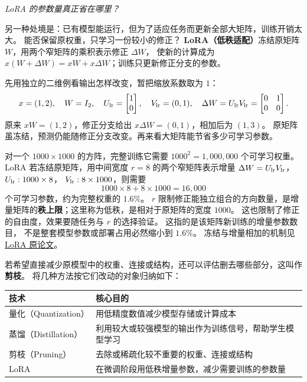 \begin{example}
\noindent\emph{LoRA 的参数量真正省在哪里？}\par

另一种处境是：已有模型能运行，但为了适应任务而更新全部大矩阵，训练开销太大。
能否保留原权重，只学习一份较小的修正？
\label{concept:lora}%
\textbf{LoRA（低秩适配）}冻结原矩阵 $W$，用两个窄矩阵的乘积表示修正 $\Delta W$，
使新的计算成为 $x(W+\Delta W)=xW+x\Delta W$；训练只更新修正分支的参数。

先用独立的二维例看输出怎样改变，暂把缩放系数取为 $1$：
\[
x=(1,2),\quad W=I_2,\quad
U_{\rm lr}=\begin{bmatrix}1\\0\end{bmatrix},\quad V_{\rm lr}=(0,1),\quad
\Delta W=U_{\rm lr}V_{\rm lr}=\begin{bmatrix}0&1\\0&0\end{bmatrix}.
\]
原来 $xW=(1,2)$，修正分支给出 $x\Delta W=(0,1)$，相加后为 $(1,3)$。
原矩阵虽冻结，预测仍能随修正分支改变。再来看大矩阵能节省多少可学习参数。

对一个 $1000\times1000$ 的方阵，完整训练它需要
$1000^2=1{,}000{,}000$ 个可学习权重。
LoRA 若冻结原矩阵，用中间宽度 $r=8$ 的两个窄矩阵表示增量
$\Delta W=U_{\rm lr}V_{\rm lr}$，$U_{\rm lr}:1000\times8$，
$V_{\rm lr}:8\times1000$，则需要
\[
1000\times8+8\times1000
=\boxed{16{,}000}
\]
个可学习参数，约为完整权重的 $1.6\%$。
$r$ 限制修正能独立组合的方向数量，是增量矩阵的\textbf{秩上限}；这里称为低秩，是相对于原矩阵的宽度 $1000$。
这也限制了修正的自由度，效果要随任务与 $r$ 的选择验证。
这指的是该矩阵新训练的增量参数数目，
不是整套模型参数或部署占用必然缩小到 $1.6\%$。
冻结与增量相加的机制见\hyperref[source:lora]{LoRA 原论文}。
\end{example}

\label{concept:pruning}%
若希望直接减少原模型中的权重、连接或结构，还可以评估删去哪些部分，这叫作\textbf{剪枝}。
将几种方法按它们改动的对象归纳如下：
\begin{center}
\small
\renewcommand{\arraystretch}{1.23}
\begin{tabularx}{\linewidth}{@{}p{38mm}X@{}}
\toprule
技术 & 核心目的\\
\midrule
量化（Quantization） & 用低精度数值减少模型存储或计算成本\\
蒸馏（Distillation） & 利用较大或较强模型的输出作为训练信号，帮助学生模型学习\\
剪枝（Pruning） & 去除或稀疏化较不重要的权重、连接或结构\\
LoRA & 在微调阶段用低秩增量参数，减少需要训练的参数量\\
\bottomrule
\end{tabularx}
\end{center}

